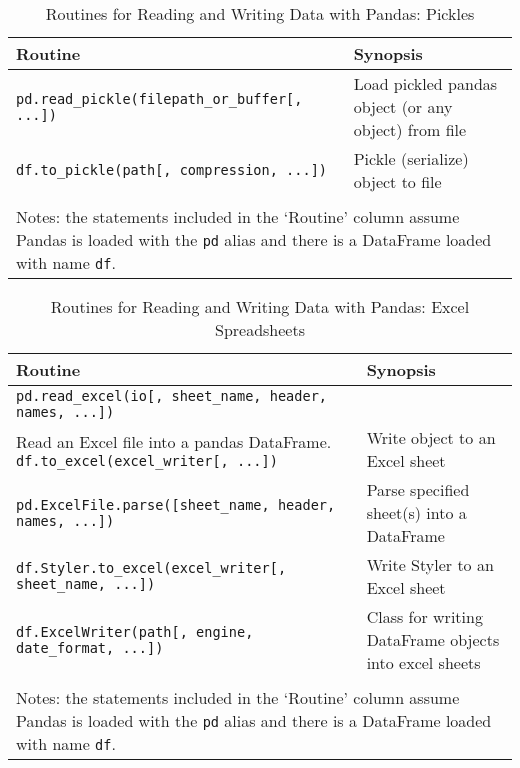 \documentclass[a4paper,11pt]{book}
\numberwithin{figure}{chapter}
\numberwithin{table}{chapter}
\begin{document}
\begin{sidewaystable}[!htbp]
	\centering
	\caption{Routines for Reading and Writing Data with Pandas: Pickles}
	\label{tab:io_pickles}
	\begin{tabular}{lp{12cm}}
		\toprule \toprule
			Routine & Synopsis \\
			\midrule
			\texttt{pd.read\_pickle(filepath\_or\_buffer[, ...])} & Load pickled pandas object (or any object) from file\\
			\texttt{df.to\_pickle(path[, compression, ...])} & Pickle (serialize) object to file\\ 
			\bottomrule \\[-1.8ex]
		    \multicolumn{2}{l}{Notes: the statements included in the `Routine' column assume Pandas is loaded with the \texttt{pd} alias and there is a DataFrame loaded with name \texttt{df}.} \\
	\end{tabular}
\end{sidewaystable}

\begin{sidewaystable}[!htbp]
	\centering
	\caption{Routines for Reading and Writing Data with Pandas: Excel Spreadsheets}
	\label{tab:io_excel}
	\begin{tabular}{lp{12cm}}
		\toprule \toprule
			Routine & Synopsis \\
			\midrule
			\texttt{pd.read\_excel(io[, sheet\_name, header, names, ...])} & \\ 
                        Read an Excel file into a pandas DataFrame.
                        \texttt{df.to\_excel(excel\_writer[, ...])} & 
                        Write object to an Excel sheet\\
                        \texttt{pd.ExcelFile.parse([sheet\_name, header, names, ...])} & 
                        Parse specified sheet(s) into a DataFrame\\
                        \texttt{df.Styler.to\_excel(excel\_writer[, sheet\_name, ...])} & 
                        Write Styler to an Excel sheet\\
                        \texttt{df.ExcelWriter(path[, engine, date\_format, ...])} & 
                        Class for writing DataFrame objects into excel sheets\\
			\bottomrule \\[-1.8ex]
		    \multicolumn{2}{l}{Notes: the statements included in the `Routine' column assume Pandas is loaded with the \texttt{pd} alias and there is a DataFrame loaded with name \texttt{df}.} \\
	\end{tabular}
\end{sidewaystable}
\end{document}
